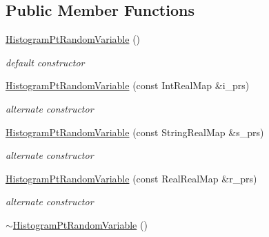 \subsection*{Public Member Functions}
\begin{DoxyCompactItemize}
\item 
\hyperlink{classPecos_1_1HistogramPtRandomVariable_a38cc5d39ce429fd42a027974fc5bd5ca}{Histogram\+Pt\+Random\+Variable} ()\label{classPecos_1_1HistogramPtRandomVariable_a38cc5d39ce429fd42a027974fc5bd5ca}

\begin{DoxyCompactList}\small\item\em default constructor \end{DoxyCompactList}\item 
\hyperlink{classPecos_1_1HistogramPtRandomVariable_a9b5daad3f441284551548a7735b931da}{Histogram\+Pt\+Random\+Variable} (const Int\+Real\+Map \&i\+\_\+prs)\label{classPecos_1_1HistogramPtRandomVariable_a9b5daad3f441284551548a7735b931da}

\begin{DoxyCompactList}\small\item\em alternate constructor \end{DoxyCompactList}\item 
\hyperlink{classPecos_1_1HistogramPtRandomVariable_aac7db4207793e67ca1fd41f0f6fcc761}{Histogram\+Pt\+Random\+Variable} (const String\+Real\+Map \&s\+\_\+prs)\label{classPecos_1_1HistogramPtRandomVariable_aac7db4207793e67ca1fd41f0f6fcc761}

\begin{DoxyCompactList}\small\item\em alternate constructor \end{DoxyCompactList}\item 
\hyperlink{classPecos_1_1HistogramPtRandomVariable_a8908dc26071d8e5f0208ac546ff6e12a}{Histogram\+Pt\+Random\+Variable} (const Real\+Real\+Map \&r\+\_\+prs)\label{classPecos_1_1HistogramPtRandomVariable_a8908dc26071d8e5f0208ac546ff6e12a}

\begin{DoxyCompactList}\small\item\em alternate constructor \end{DoxyCompactList}\item 
\hyperlink{classPecos_1_1HistogramPtRandomVariable_a80cdabb336eb027b7634a6bf02a1460d}{$\sim$\+Histogram\+Pt\+Random\+Variable} ()\label{classPecos_1_1HistogramPtRandomVariable_a80cdabb336eb027b7634a6bf02a1460d}


\end{DoxyCompactItemize}
